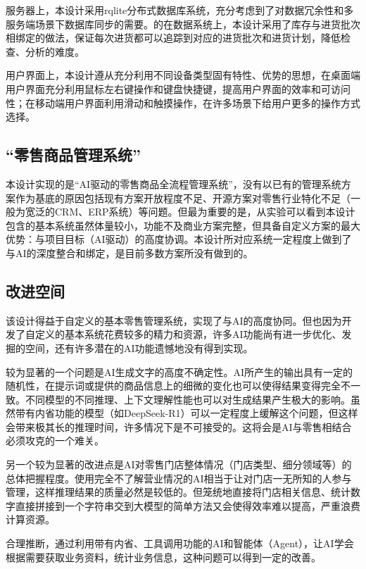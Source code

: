 服务器上，本设计采用rqlite分布式数据库系统，充分考虑到了对数据冗余性和多服务端场景下数据库同步的需要。的在数据系统上，本设计采用了库存与进货批次相绑定的做法，保证每次进货都可以追踪到对应的进货批次和进货计划，降低检查、分析的难度。

用户界面上，本设计遵从充分利用不同设备类型固有特性、优势的思想，在桌面端用户界面充分利用鼠标左右键操作和键盘快捷键，提高用户界面的效率和可访问性；在移动端用户界面利用滑动和触摸操作，在许多场景下给用户更多的操作方式选择。

\subsection{“零售商品管理系统”}

本设计实现的是“AI驱动的零售商品全流程管理系统”，没有以已有的管理系统方案作为基底的原因包括现有方案开放程度不足、开源方案对零售行业特化不足（一般为宽泛的CRM、ERP系统）等问题。但最为重要的是，从实验可以看到本设计包含的基本系统虽然体量较小，功能不及商业方案完整，但具备自定义方案的最大优势：与项目目标（AI驱动）的高度协调。本设计所对应系统一定程度上做到了与AI的深度整合和绑定，是目前多数方案所没有做到的。

\subsection{改进空间}

该设计得益于自定义的基本零售管理系统，实现了与AI的高度协同。但也因为开发了自定义的基本系统花费较多的精力和资源，许多AI功能尚有进一步优化、发掘的空间，还有许多潜在的AI功能遗憾地没有得到实现。

较为显著的一个问题是AI生成文字的高度不确定性。AI所产生的输出具有一定的随机性，在提示词或提供的商品信息上的细微的变化也可以使得结果变得完全不一致。不同模型的不同推理、上下文理解性能也可以对生成结果产生极大的影响。虽然带有内省功能的模型（如DeepSeek-R1）可以一定程度上缓解这个问题，但这样会带来极其长的推理时间，许多情况下是不可接受的。这将会是AI与零售相结合必须攻克的一个难关。

另一个较为显著的改进点是AI对零售门店整体情况（门店类型、细分领域等）的总体把握程度。使用完全不了解营业情况的AI相当于让对门店一无所知的人参与管理，这样推理结果的质量必然是较低的。但笼统地直接将门店相关信息、统计数字直接拼接到一个字符串交到大模型的简单方法又会使得效率难以提高，严重浪费计算资源。

合理推断，通过利用带有内省、工具调用功能的AI和智能体（Agent），让AI学会根据需要获取业务资料，统计业务信息，这种问题可以得到一定的改善。
